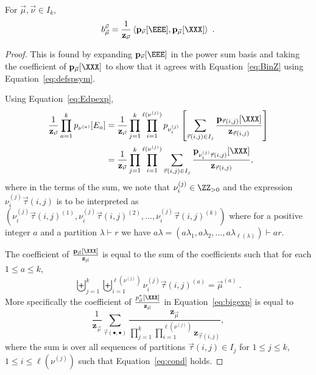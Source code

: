 \begin{cor}\label{cor:bscalar}
For $\vec{\mu}, \vec{\nu} \in I_k$,
\begin{equation}\label{eq:sfbcoef}
b_{\vec{\mu}}^{\vec{\nu}}
= \frac{1}{\mathbf{z}_{\vec{\nu}}}\left< \mathbf{p}_{\vec{\nu}}[\EEE], \mathbf{p}_{\vec{\mu}}[\XXX] \right>~.
\end{equation}
\end{cor}
\begin{proof}
This is found by expanding $\mathbf{p}_{\vec{\nu}}[\EEE]$
in the power sum basis and taking the coefficient of $\mathbf{p}_{\vec{\mu}}[\XXX]$
to show that it agrees with Equation~\eqref{eq:BinZ} using Equation~\eqref{eq:defspsym}.

Using Equation~\eqref{eq:Edpexp},
\begin{align}
\frac{1}{\mathbf{z}_{\vec{\nu}}} \prod_{a=1}^k p_{\nu^{(a)}}[E_a]
&=
\frac{1}{\mathbf{z}_{\vec{\nu}}} \prod_{j=1}^k
\prod_{i=1}^{\ell(\nu^{(j)})} p_{\nu^{(j)}_i}\left[
\sum_{\vec{\tau}(i,j) \in I_j}
\frac{\mathbf{p}_{\vec{\tau}(i,j)}[\XXX]}{\mathbf{z}_{\vec{\tau}(i,j)}}\right]\\
&=\label{eq:bigexp}
\frac{1}{\mathbf{z}_{\vec{\nu}}} \prod_{j=1}^k
\prod_{i=1}^{\ell(\nu^{(j)})}
\sum_{\vec{\tau}(i,j) \in I_j}
\frac{\mathbf{p}_{\nu^{(j)}_i\vec{\tau}(i,j)}[\XXX]}{\mathbf{z}_{\vec{\tau}(i,j)}},
\end{align}
where in the terms of the sum, we note that $\nu^{(j)}_i \in \ZZ_{>0}$
and the expression $\nu^{(j)}_i\vec{\tau}(i,j)$ is to be interpreted
as $( \nu^{(j)}_i \vec{\tau}(i,j)^{(1)}, \nu^{(j)}_i \vec{\tau}(i,j)^{(2)},
\ldots, \nu^{(j)}_i \vec{\tau}(i,j)^{(k)})$ where for a positive integer $a$
and a partition $\lambda \vdash r$ we have
$a \lambda = (a \lambda_1, a \lambda_2,
\ldots, a \lambda_{\ell(\lambda)})\vdash ar$.

The coefficient of $\frac{\mathbf{p}_{\vec{\mu}}[\XXX]}{\mathbf{z}_{\vec{\mu}}}$
is equal to the sum of the coefficients such that
for each $1 \leqslant a \leqslant k$,
\begin{equation}\label{eq:cond}
    \biguplus_{j=1}^k \biguplus_{i=1}^{\ell(\nu^{(j)})} \nu^{(j)}_i\vec{\tau}(i,j)^{(a)} = \vec{\mu}^{(a)}~.
\end{equation}
More specifically the coefficient of $\frac{p^\ast_{\vec{\mu}}[\XXX]}{\mathbf{z}_{\vec{\mu}}}$
in Equation~\eqref{eq:bigexp} is equal to
\begin{equation}\label{eq:coeffp}
    \frac{1}{\mathbf{z}_{\vec{\nu}}}
    \sum_{\vec{\tau}(\bullet,\bullet)}
    \frac{\mathbf{z}_{\vec{\mu}}}
    {\prod_{j=1}^k \prod_{i=1}^{\ell(\nu^{(j)})} \mathbf{z}_{\vec{\tau}(i,j)}},
\end{equation}
where the sum is over all sequences of partitions $\vec{\tau}(i,j) \in I_j$ for $1\leqslant j \leqslant k$,
$1 \leqslant i \leqslant \ell(\nu^{(j)})$ such that
Equation~\eqref{eq:cond} holds.
\end{proof}

